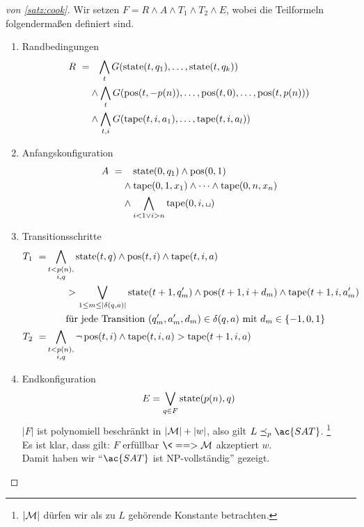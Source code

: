 {\begin{proof}[von \autoref{satz:cook}]
	Wir setzen $F = R \land A\land T_1 \land T_2 \land E$, wobei die Teilformeln folgendermaßen definiert sind.
	\begin{enumerate}
	\item Randbedingungen
		\begin{align*}
			R\ =&\phantom{\land}\, \bigwedge_t G(\operatorname{state}(t,q_1),\dots,\operatorname{state}(t,q_k))\\
			& \land \bigwedge_t G(\operatorname{pos}(t,-p(n)),\dots,\operatorname{pos}(t,0),\dots,\operatorname{pos}(t,p(n)))\\
			& \land \bigwedge_{t,i} G(\operatorname{tape}(t,i,a_1),\dots,\operatorname{tape}(t,i,a_l))
		\end{align*}
	\item Anfangskonfiguration
		\begin{align*}
			A\ =&\phantom{\land}\; \state(0,q_1)\land \pos(0,1)\\
			&\land\tape(0,1,x_1)\land\dots\land\tape(0,n,x_n)\\
			&\land\bigwedge_{i< 1 \lor i > n} \tape(0,i,\blank)
		\end{align*}
	\item Transitionsschritte
	\begin{align*}
		T_1\ =& \bigwedge_{\substack{t < p(n),\\i,q}} \operatorname{state}(t,q)\land \operatorname{pos}(t,i) \land \operatorname{tape}(t,i,a)\\
		&\qquad \-> \bigvee_{1 \leq m \leq |\delta(q,a)|} \operatorname{state}(t+1,q_m')\land \operatorname{pos}(t+1,i+d_m) \land \operatorname{tape}(t+1,i,a_m')\\
		&\qquad \text{für jede Transition } (q_m',a_m',d_m) \in \delta(q,a) \text{ mit } d_m\in\{-1,0,1\}\\
		T_2\ =& \bigwedge_{\substack{t < p(n),\\i,q}} \neg \operatorname{pos}(t,i)\land \operatorname{tape}(t,i,a) \-> \operatorname{tape}(t+1,i,a)
	\end{align*}
	\item Endkonfiguration%
		\[ E = \bigvee_{q\in F} \operatorname{state}(p(n),q) \]
		$|F|$ ist polynomiell beschränkt in $|\mathcal{M}|+|w|$, also gilt $L\preceq_p \ac{SAT}$.%
		\footnote{$|\mathcal{M}|$ dürfen wir als zu $L$ gehörende Konstante betrachten.}\\
		Es ist klar, dass gilt: $F$ erfüllbar $\<==> \M$ akzeptiert $w$.\\
		Damit haben wir "`$\ac{SAT}$ ist \ac{NP}-vollständig"' gezeigt.
		\qedhere
	\end{enumerate}
\end{proof}

}
